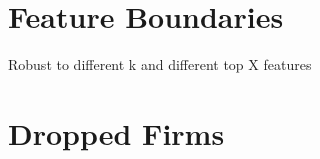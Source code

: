\section{Feature Boundaries}
Robust to different k and different top X features

\section{Dropped Firms}

